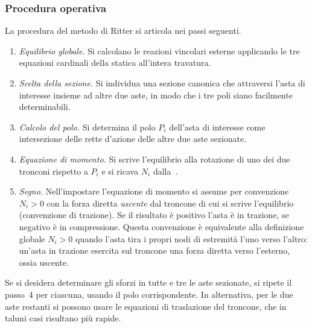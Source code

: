 \subsubsection{Procedura operativa} La procedura del metodo di Ritter si articola nei
passi seguenti.

\begin{enumerate}[noitemsep]
	\item \emph{Equilibrio globale.} Si calcolano
	le reazioni vincolari esterne applicando
	le tre equazioni cardinali della statica
	all'intera travatura.
	\item \emph{Scelta della sezione.} Si individua
	una sezione canonica che attraversi l'asta
	di interesse insieme ad altre due aste, in
	modo che i tre poli siano facilmente
	determinabili.
	\item \emph{Calcolo del polo.} Si determina il
	polo $P_i$ dell'asta di interesse come
	intersezione delle rette d'azione delle
	altre due aste sezionate.
	\item \emph{Equazione di momento.} Si scrive
	l'equilibrio alla rotazione di uno dei due
	tronconi rispetto a $P_i$ e si ricava $N_i$
	dalla~.
	\item \emph{Segno.} Nell'impostare l'equazione
	di momento si assume per convenzione $N_i > 0$
	con la forza diretta \emph{uscente} dal troncone
	di cui si scrive l'equilibrio (convenzione di
	trazione). Se il risultato è positivo l'asta
	è in trazione, se negativo è in compressione.
	Questa convenzione è equivalente alla
	definizione globale $N_i > 0$ quando l'asta
	tira i propri nodi di estremità l'uno verso
	l'altro: un'asta in trazione esercita sul
	troncone una forza diretta verso l'esterno,
	ossia uscente.
\end{enumerate}

Se si desidera determinare gli sforzi in tutte e tre
le aste sezionate, si ripete il passo~4 per ciascuna,
usando il polo corrispondente. In alternativa, per
le due aste restanti si possono usare le equazioni
di traslazione del troncone, che in taluni casi
risultano più rapide.

